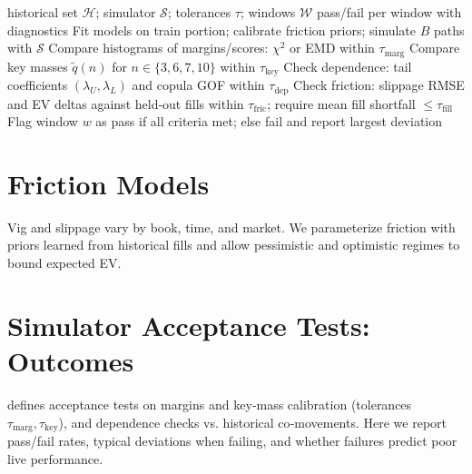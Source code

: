 \begin{algorithm}[t]
  \caption{Simulator Acceptance Test Suite}
  \label{alg:sim-accept}
  \begin{algorithmic}[1]
    \Require historical set $\mathcal H$; simulator $\mathcal S$; tolerances $\tau$; windows $\mathcal W$
    \Ensure pass/fail per window with diagnostics
      \State Fit models on train portion; calibrate friction priors; simulate $B$ paths with $\mathcal S$
      \State Compare histograms of margins/scores: $\chi^2$ or EMD within $\tau_{\text{marg}}$
      \State Compare key masses $\tilde q(n)$ for $n\in\{3,6,7,10\}$ within $\tau_{\text{key}}$
      \State Check dependence: tail coefficients $(\lambda_U,\lambda_L)$ and copula GOF within $\tau_{\text{dep}}$
      \State Check friction: slippage RMSE and EV deltas against held‑out fills within $\tau_{\text{fric}}$; require mean fill shortfall $\le \tau_{\text{fill}}$
      \State Flag window $w$ as pass if all criteria met; else fail and report largest deviation
    \EndFor
  \end{algorithmic}
\end{algorithm}

\section{Friction Models}
Vig and slippage vary by book, time, and market. We parameterize friction with priors learned from historical fills and allow pessimistic and optimistic regimes to bound expected EV.


\section{Simulator Acceptance Tests: Outcomes}\label{sec:sim-acceptance-outcomes}
 defines acceptance tests on margins and key‑mass calibration (tolerances $\tau_{\mathrm{marg}},\tau_{\mathrm{key}}$), and dependence checks vs. historical co‑movements. Here we report pass/fail rates, typical deviations when failing, and whether failures predict poor live performance.

